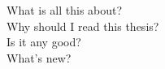 \newpage
What is all this about?
\\
Why should I read this thesis?
\\
Is it any good?
\\
What's new?
